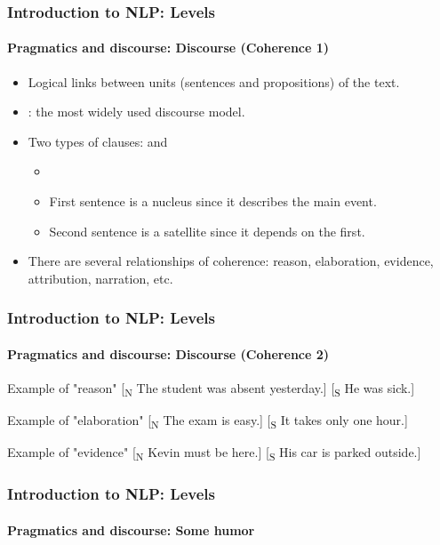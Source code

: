 \documentclass[xcolor=table]{beamer}
\begin{document}
\begin{frame}
\frametitle{Introduction to NLP: Levels}
\framesubtitle{Pragmatics and discourse: Discourse (Coherence 1)}

\begin{itemize}
	\item Logical links between units (sentences and propositions) of the text.
	\item {}: the most widely used discourse model.
	\item Two types of clauses:  and 
	\begin{itemize}
		\item {}
		\item First sentence is a nucleus since it describes the main event.
		\item Second sentence is a satellite since it depends on the first.
	\end{itemize}
	\item There are several relationships of coherence: reason, elaboration, evidence, attribution, narration, etc.
\end{itemize}

\end{frame}

\begin{frame}
\frametitle{Introduction to NLP: Levels}
\framesubtitle{Pragmatics and discourse: Discourse (Coherence 2)}

\begin{exampleblock}{Example of "reason"}
	[\textsubscript{N} The student was absent yesterday.] [\textsubscript{S} He was sick.]
\end{exampleblock}

\begin{exampleblock}{Example of "elaboration"}
	[\textsubscript{N} The exam is easy.] [\textsubscript{S} It takes only one hour.]
\end{exampleblock}

\begin{exampleblock}{Example of "evidence"}
	[\textsubscript{N} Kevin must be here.] [\textsubscript{S} His car is parked outside.]
\end{exampleblock}

\end{frame}

\begin{frame}
\frametitle{Introduction to NLP: Levels}
\framesubtitle{Pragmatics and discourse: Some humor}

\begin{center}
\end{center}

\end{frame}
\end{document}
